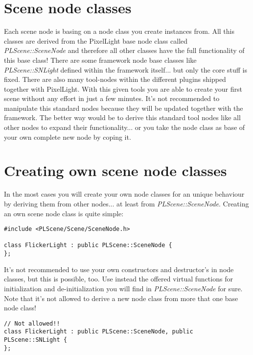 \section{Scene node classes}
Each scene node is basing on a node class you create instances from. All this classes are derived from the PixelLight base node class called \emph{PLScene::SceneNode} and therefore all other classes have the full functionality of this base class! There are some framework node base classes like \emph{PLScene::SNLight} defined within the framework itself... but only the core stuff is fixed. There are also many tool-nodes within the different plugins shipped together with PixelLight. With this given tools you are able to create your first scene without any effort in just a few minutes. It's not recommended to manipulate this standard nodes because they will be updated together with the framework. The better way would be to derive this standard tool nodes like all other nodes to expand their functionality... or you take the node class as base of your own complete new node by coping it.




\section{Creating own scene node classes}
In the most cases you will create your own node classes for an unique behaviour by deriving them from other nodes... at least from \emph{PLScene::SceneNode}. Creating an own scene node class is quite simple:

\begin{lstlisting}[caption=Creating a new own scene node class]
#include <PLScene/Scene/SceneNode.h>

class FlickerLight : public PLScene::SceneNode {
};
\end{lstlisting}

It's not recommended to use your own constructors and destructor's in node classes, but this is possible, too. Use instead the offered virtual functions for initialization and de-initialization you will find in \emph{PLScene::SceneNode} for sure. Note that it's not allowed to derive a new node class from more that one base node class!

\begin{lstlisting}[caption=Invalid scene node class creating]
// Not allowed!!
class FlickerLight : public PLScene::SceneNode, public PLScene::SNLight {
};
\end{lstlisting}

